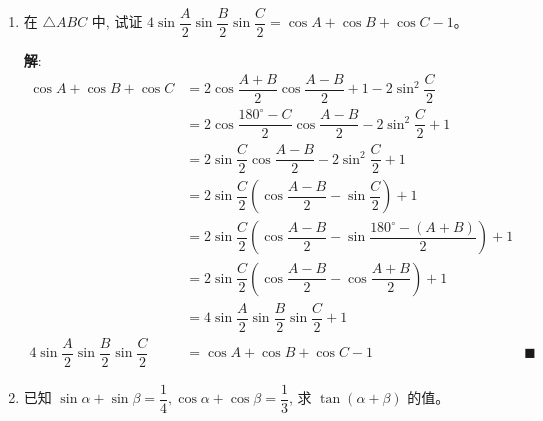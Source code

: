 \documentclass{report}
\newcommand{\sol}{\vspace{0.2cm}\textbf{解}:}
\begin{document}
\begin{enumerate}[leftmargin=*]
    \sol{}
    \begin{align*}
        &\ \ \ \sin 5 x \sin 4 x-\sin 3 x \sin 2 x-\sin 8 x \sin x\\
        & = \dfrac{1}{2}\left[-\cos 9x + \cos x + \cos 5x - \cos x + \cos 9x - \cos 7x\right] \\
        & = -\dfrac{1}{2}(\cos 7x - \cos 5x) \\
        & = \sin 6x \sin x \\
        & = \dfrac{1}{\sin x} \cdot \sin x \\
        & = 1 &\blacksquare
    \end{align*}

    \item 在 $\triangle {ABC}$ 中, 试证 $4 \sin \dfrac{{A}}{2} \sin \dfrac{{B}}{2} \sin \dfrac{{C}}{2}=\cos {A}+\cos {B}+\cos {C}-1$。
    
    \sol{}
    \begin{align*}
        \cos {A}+\cos {B}+\cos {C} &= 2\cos \dfrac{A+B}{2}\cos \dfrac{A-B}{2} + 1 - 2\sin^2 \dfrac{C}{2} \\
        &= 2\cos \dfrac{180^{\circ}-C}{2}\cos \dfrac{A-B}{2} - 2\sin^2 \dfrac{C}{2} + 1 \\
        &= 2\sin \dfrac{C}{2}\cos \dfrac{A-B}{2} - 2\sin^2 \dfrac{C}{2} + 1 \\
        &= 2\sin \dfrac{C}{2}\left(\cos \dfrac{A-B}{2} - \sin \dfrac{C}{2}\right) + 1 \\
        &= 2\sin \dfrac{C}{2}\left(\cos \dfrac{A-B}{2} - \sin\dfrac{180^{\circ}-(A+B)}{2}\right) + 1 \\
        &= 2\sin \dfrac{C}{2}\left(\cos \dfrac{A-B}{2} - \cos \dfrac{A+B}{2}\right) + 1 \\
        &= 4\sin \dfrac{A}{2}\sin \dfrac{B}{2}\sin \dfrac{C}{2} + 1 \\
        4 \sin \dfrac{{A}}{2} \sin \dfrac{{B}}{2} \sin \dfrac{{C}}{2} &= \cos {A}+\cos {B}+\cos {C}-1 &\blacksquare
    \end{align*}
    \item 已知 $\sin \alpha+\sin \beta=\dfrac{1}{4}, \cos \alpha+\cos \beta=\dfrac{1}{3}$, 求 $\tan (\alpha+\beta)$ 的值。
    

\end{enumerate}
\end{document}
